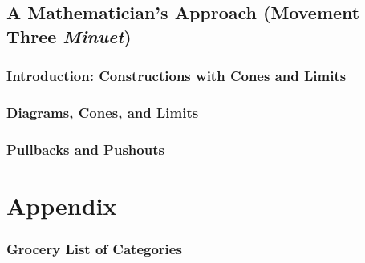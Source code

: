 \documentclass[draft]{amsart}
\theoremstyle{plain}
\theoremstyle{definition}
\begin{document}
\chapter{A Mathematician's Approach (Movement Three \emph{Minuet})}
\section{Introduction: Constructions with Cones and Limits}

\section{Diagrams, Cones, and Limits}

\section{Pullbacks and Pushouts}




%
%

\part*{Appendix}
\begin{appendix}
\section{Grocery List of Categories}

\nocite{*}


\end{appendix}
\end{document}
